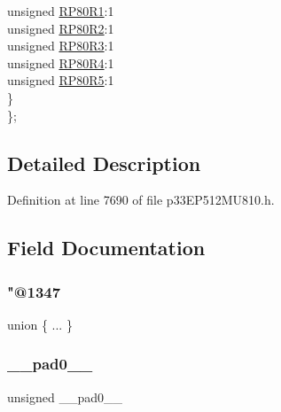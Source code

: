 \begin{DoxyCompactItemize}
\begin{tabbing}
\>\>unsigned \hyperlink{structtag_r_p_o_r4_b_i_t_s_a1205869446ff237072a118ca95d35ecb}{RP80R1}:1\\
\>\>unsigned \hyperlink{structtag_r_p_o_r4_b_i_t_s_a3d578ae2bb863708e68f365bcfa3f05d}{RP80R2}:1\\
\>\>unsigned \hyperlink{structtag_r_p_o_r4_b_i_t_s_ae167d32e65ce719a560059db89831799}{RP80R3}:1\\
\>\>unsigned \hyperlink{structtag_r_p_o_r4_b_i_t_s_aef494fba91a3032ddbdbede8247f2a97}{RP80R4}:1\\
\>\>unsigned \hyperlink{structtag_r_p_o_r4_b_i_t_s_a42bad3c23730a336a923bf4ed016fa53}{RP80R5}:1\\
\>\} \\
\}; \\

\end{tabbing}\end{DoxyCompactItemize}


\subsection{Detailed Description}


Definition at line 7690 of file p33\+E\+P512\+M\+U810.\+h.



\subsection{Field Documentation}
\mbox{\label{structtag_r_p_o_r4_b_i_t_s_ae01f017cb5e1b50cc502b85260a3d8bf}} 
\subsubsection{\texorpdfstring{"@1347}{@1347}}
{\footnotesize\ttfamily union \{ ... \} }

\mbox{\label{structtag_r_p_o_r4_b_i_t_s_adf71f3d8410c1f1dbbc96680a92c49af}} 
\subsubsection{\texorpdfstring{\+\_\+\+\_\+pad0\+\_\+\+\_\+}{\_\_pad0\_\_}}
{\footnotesize\ttfamily unsigned \+\_\+\+\_\+pad0\+\_\+\+\_\+}



